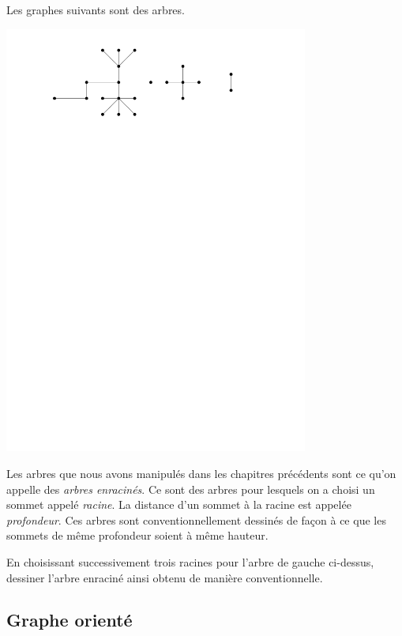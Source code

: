 \documentclass{magnolia}
\begin{document}
\begin{remarques}
\remarque Les graphes suivants sont des arbres.
\begin{center}
\includegraphics[width = 10cm]{../../Commun/Images/info-cours-graphe-theorie-foret}
\end{center}
\remarque Les arbres que nous avons manipulés dans les chapitres précédents sont ce
  qu'on appelle des \emph{arbres enracinés}. Ce sont des arbres
  pour lesquels on a choisi un sommet appelé \emph{racine}. 
  La distance d'un sommet à la racine est appelée \emph{profondeur}.
  Ces arbres sont conventionnellement dessinés de façon à ce que les sommets de même
  profondeur soient à même hauteur.
\end{remarques}
\vspace{2ex}
\begin{exoUnique}
\exo En choisissant successivement trois racines pour l'arbre de gauche ci-dessus, dessiner
  l'arbre enraciné ainsi obtenu de manière conventionnelle.
\end{exoUnique}

\subsection{Graphe orienté}
\end{document}
